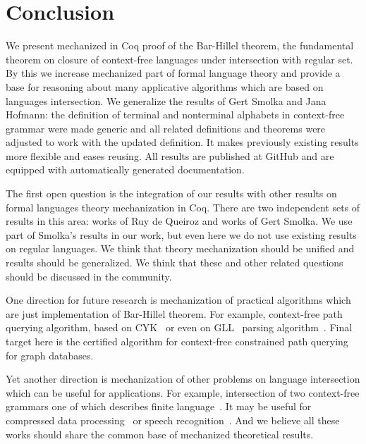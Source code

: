 \section{Conclusion}
\label{sec:conclusion}

We present mechanized in Coq proof of the Bar-Hillel theorem, the fundamental theorem on closure of context-free languages under intersection with regular set.
By this we increase mechanized part of formal language theory and provide a base for reasoning about many applicative algorithms which are based on languages intersection.
We generalize the results of Gert Smolka and Jana Hofmann: the definition of terminal and nonterminal alphabets in context-free grammar were made generic and all related definitions and theorems were adjusted to work with the updated definition.
It makes previously existing results more flexible and eases reusing.
All results are published at GitHub and are equipped with automatically generated documentation.

The first open question is the integration of our results with other results on formal languages theory mechanization in Coq. 
There are two independent sets of results in this area: works of Ruy de Queiroz and works of Gert Smolka.
We use part of Smolka's results in our work, but even here we do not use existing results on regular languages.
We think that theory mechanization should be unified and results should be generalized.
We think that these and other related questions should be discussed in the community.

One direction for future research is mechanization of practical algorithms which are just implementation of Bar-Hillel theorem.
For example, context-free path querying algorithm, based on CYK~\cite{hellingsPathQuerying,zhang2016context} or even on GLL~\cite{scott2010gll} parsing algorithm~\cite{grigorev2016context}.
Final target here is the certified algorithm for context-free constrained path querying for graph databases.

Yet another direction is mechanization of other problems on language intersection which can be useful for applications.
For example, intersection of two context-free grammars one of which describes finite language~\cite{nederhof2002parsing, nederhof2004language}.
It may be useful for compressed data processing~\cite{Lohrey2012AlgorithmicsOS} or speech recognition~\cite{Nederhof:2002:PNC:1073083.1073104,NEDERHOF2004172}.
And we believe all these works should share the common base of mechanized theoretical results.



